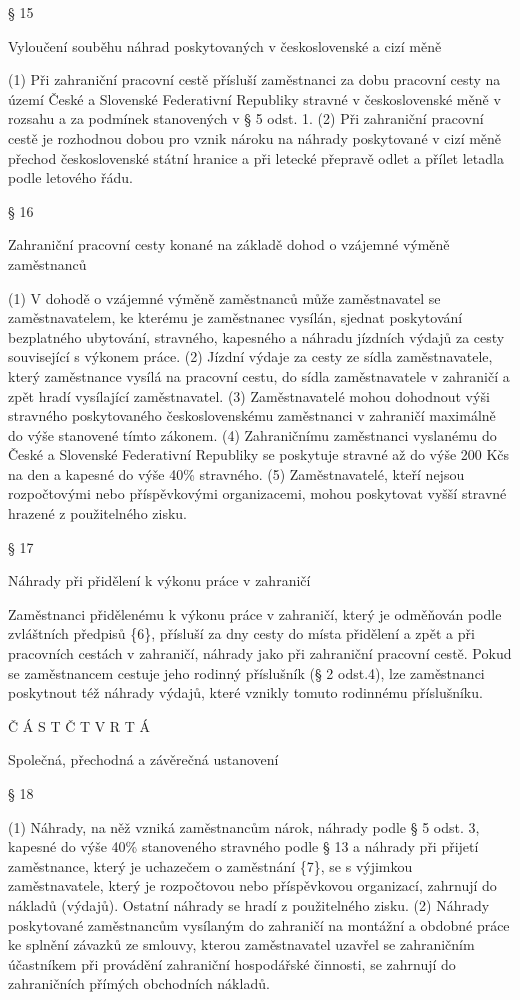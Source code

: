 \documentclass[11pt,a4paper]{article}
\begin{document}
§ 15

Vyloučení souběhu náhrad poskytovaných v československé a cizí měně

(1) Při zahraniční pracovní cestě přísluší zaměstnanci za dobu pracovní cesty na území České a Slovenské Federativní Republiky stravné v československé měně v rozsahu a za podmínek stanovených v § 5 odst. 1. (2) Při zahraniční pracovní cestě je rozhodnou dobou pro vznik nároku na náhrady poskytované v cizí měně přechod československé státní hranice a při letecké přepravě odlet a přílet letadla podle letového řádu.

§ 16

Zahraniční pracovní cesty konané na základě dohod o vzájemné výměně zaměstnanců

(1) V dohodě o vzájemné výměně zaměstnanců může zaměstnavatel se zaměstnavatelem, ke kterému je zaměstnanec vysílán, sjednat poskytování bezplatného ubytování, stravného, kapesného a náhradu jízdních výdajů za cesty související s výkonem práce. (2) Jízdní výdaje za cesty ze sídla zaměstnavatele, který zaměstnance vysílá na pracovní cestu, do sídla zaměstnavatele v zahraničí a zpět hradí vysílající zaměstnavatel. (3) Zaměstnavatelé mohou dohodnout výši stravného poskytovaného československému zaměstnanci v zahraničí maximálně do výše stanovené tímto zákonem. (4) Zahraničnímu zaměstnanci vyslanému do České a Slovenské Federativní Republiky se poskytuje stravné až do výše 200 Kčs na den a kapesné do výše 40\% stravného. (5) Zaměstnavatelé, kteří nejsou rozpočtovými nebo příspěvkovými organizacemi, mohou poskytovat vyšší stravné hrazené z použitelného zisku.

§ 17

Náhrady při přidělení k výkonu práce v zahraničí

Zaměstnanci přidělenému k výkonu práce v zahraničí, který je odměňován podle zvláštních předpisů \{6\}, přísluší za dny cesty do místa přidělení a zpět a při pracovních cestách v zahraničí, náhrady jako při zahraniční pracovní cestě. Pokud se zaměstnancem cestuje jeho rodinný příslušník (§ 2 odst.4), lze zaměstnanci poskytnout též náhrady výdajů, které vznikly tomuto rodinnému příslušníku.

Č Á S T Č T V R T Á

Společná, přechodná a závěrečná ustanovení

§ 18

(1) Náhrady, na něž vzniká zaměstnancům nárok, náhrady podle § 5 odst. 3, kapesné do výše 40\% stanoveného stravného podle § 13 a náhrady při přijetí zaměstnance, který je uchazečem o zaměstnání \{7\}, se s výjimkou zaměstnavatele, který je rozpočtovou nebo příspěvkovou organizací, zahrnují do nákladů (výdajů). Ostatní náhrady se hradí z použitelného zisku. (2) Náhrady poskytované zaměstnancům vysílaným do zahraničí na montážní a obdobné práce ke splnění závazků ze smlouvy, kterou zaměstnavatel uzavřel se zahraničním účastníkem při provádění zahraniční hospodářské činnosti, se zahrnují do zahraničních přímých obchodních nákladů.
\end{document}
